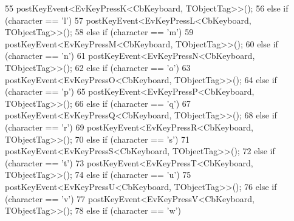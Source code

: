\begin{DoxyCode}
55                                 postKeyEvent<EvKeyPressK<CbKeyboard, TObjectTag>>();
56                         \textcolor{keywordflow}{else} \textcolor{keywordflow}{if} (character == \textcolor{charliteral}{'l'})
57                                 postKeyEvent<EvKeyPressL<CbKeyboard, TObjectTag>>();
58                         \textcolor{keywordflow}{else} \textcolor{keywordflow}{if} (character == \textcolor{charliteral}{'m'})
59                                 postKeyEvent<EvKeyPressM<CbKeyboard, TObjectTag>>();
60                         \textcolor{keywordflow}{else} \textcolor{keywordflow}{if} (character == \textcolor{charliteral}{'n'})
61                                 postKeyEvent<EvKeyPressN<CbKeyboard, TObjectTag>>();
62                         \textcolor{keywordflow}{else} \textcolor{keywordflow}{if} (character == \textcolor{charliteral}{'o'})
63                                 postKeyEvent<EvKeyPressO<CbKeyboard, TObjectTag>>();
64                         \textcolor{keywordflow}{else} \textcolor{keywordflow}{if} (character == \textcolor{charliteral}{'p'})
65                                 postKeyEvent<EvKeyPressP<CbKeyboard, TObjectTag>>();
66                         \textcolor{keywordflow}{else} \textcolor{keywordflow}{if} (character == \textcolor{charliteral}{'q'})
67                                 postKeyEvent<EvKeyPressQ<CbKeyboard, TObjectTag>>();
68                         \textcolor{keywordflow}{else} \textcolor{keywordflow}{if} (character == \textcolor{charliteral}{'r'})
69                                 postKeyEvent<EvKeyPressR<CbKeyboard, TObjectTag>>();
70                         \textcolor{keywordflow}{else} \textcolor{keywordflow}{if} (character == \textcolor{charliteral}{'s'})
71                                 postKeyEvent<EvKeyPressS<CbKeyboard, TObjectTag>>();
72                         \textcolor{keywordflow}{else} \textcolor{keywordflow}{if} (character == \textcolor{charliteral}{'t'})
73                                 postKeyEvent<EvKeyPressT<CbKeyboard, TObjectTag>>();
74                         \textcolor{keywordflow}{else} \textcolor{keywordflow}{if} (character == \textcolor{charliteral}{'u'})
75                                 postKeyEvent<EvKeyPressU<CbKeyboard, TObjectTag>>();
76                         \textcolor{keywordflow}{else} \textcolor{keywordflow}{if} (character == \textcolor{charliteral}{'v'})
77                                 postKeyEvent<EvKeyPressV<CbKeyboard, TObjectTag>>();
78                         \textcolor{keywordflow}{else} \textcolor{keywordflow}{if} (character == \textcolor{charliteral}{'w'})

\end{DoxyCode}
